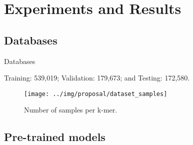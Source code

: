\documentclass[10pt]{beamer}
\newcommand{\1}{
	\setbeamertemplate{background}{
		\texttt{[image: img/1]}
		\tikz[overlay] \fill[fill opacity=0.75,fill=white] (0,0) rectangle (-\paperwidth,\paperheight);
	}
}
\begin{document}
\section{Experiments and Results}

\subsection{Databases}

\begin{frame}{Databases}{}
	
	Training: 539,019; Validation: 179,673; and Testing: 172,580.
	
	\begin{figure}[]
		\centering\texttt{[image: ../img/proposal/dataset\_samples]}
		\caption{
			Number of samples per k-mer.}
		\label{fig:samples}
	\end{figure}
	
\end{frame}

\subsection{Pre-trained models}
\end{document}
